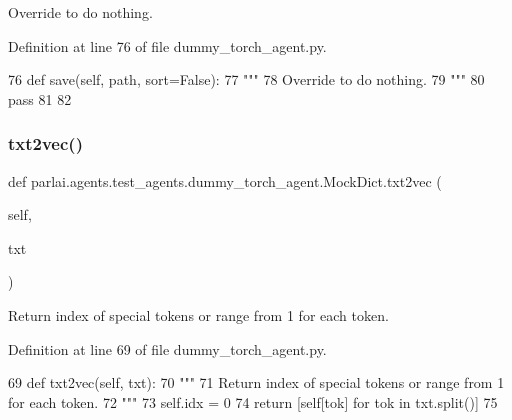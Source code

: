 \begin{DoxyVerb}Override to do nothing.
\end{DoxyVerb}
 

Definition at line 76 of file dummy\+\_\+torch\+\_\+agent.\+py.


\begin{DoxyCode}
76     \textcolor{keyword}{def }save(self, path, sort=False):
77         \textcolor{stringliteral}{"""}
78 \textcolor{stringliteral}{        Override to do nothing.}
79 \textcolor{stringliteral}{        """}
80         \textcolor{keywordflow}{pass}
81 
82 
\end{DoxyCode}
\mbox{\label{classparlai_1_1agents_1_1test__agents_1_1dummy__torch__agent_1_1MockDict_a390123aa7a8a16f5971a7dfbe261d353}} 
\subsubsection{\texorpdfstring{txt2vec()}{txt2vec()}}
{\footnotesize\ttfamily def parlai.\+agents.\+test\+\_\+agents.\+dummy\+\_\+torch\+\_\+agent.\+Mock\+Dict.\+txt2vec (\begin{DoxyParamCaption}\item[{}]{self,  }\item[{}]{txt }\end{DoxyParamCaption})}

\begin{DoxyVerb}Return index of special tokens or range from 1 for each token.
\end{DoxyVerb}
 

Definition at line 69 of file dummy\+\_\+torch\+\_\+agent.\+py.


\begin{DoxyCode}
69     \textcolor{keyword}{def }txt2vec(self, txt):
70         \textcolor{stringliteral}{"""}
71 \textcolor{stringliteral}{        Return index of special tokens or range from 1 for each token.}
72 \textcolor{stringliteral}{        """}
73         self.idx = 0
74         \textcolor{keywordflow}{return} [self[tok] \textcolor{keywordflow}{for} tok \textcolor{keywordflow}{in} txt.split()]
75 
\end{DoxyCode}


